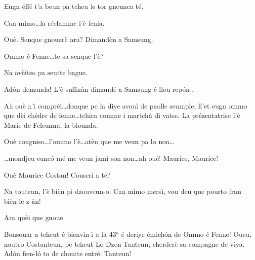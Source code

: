\begin{drama}
\Vioupspeaks Eugn éffé t'a beun pa tcheu le tor gneunca té.

\Vioujspeaks{} Can mimo\ldots la réclamme l'è fenia.

\Vioupspeaks Ouè. Senque gnouerè ara? Dimandèn a Samsung.


\Vioupspeaks \og Ommo é Fenne\fg\ldots te sa senque l'è?

\Vioujspeaks{} Na avèitso pa seutte bague.

\Vioupspeaks Ad\'on demanda! L'è suffizàn dimandé a Samsung é llou rep\'on .


\Vioupspeaks Ah ouè n'i comprèi\ldots donque pe la diye avouì de paolle seumple, ll'et eugn ommo que dèi chédre de fenne\ldots tchica comme i martchà di vatse. La prézentatrise l'è Marie de Feleunna, la blounda.

\Vioujspeaks Ouè cougniso\ldots l'ommo l'è\ldots atèn que me veun pa lo non\ldots

\Vioupspeaks \ldots mondjeu eunc\'o mé me veun jamì son non\ldots ah oué! Maurice, Maurice!

\Vioujspeaks Ouè Maurice Costan! Couscrì a té?

\Vioupspeaks Na touteun, l'è bièn pi dzouveun-o. Can mimo mersì, vou deu que pourto fran bièn le-z-àn!

\Vioujspeaks Ara quèi que gnoue.








\Mariespeaks Bonsouar a tcheut é bienvin-ì a la 43$^a$ é deriye émich\'on de \og Ommo é Fenne\fg! Oueu, noutro Costanteun, pe tcheut \og Lo Dzen Tanteun\fg, cherderè sa compagne de viya. Ad\'on fien-l\'o to de chouite entré: Tanteun!


\end{drama}
